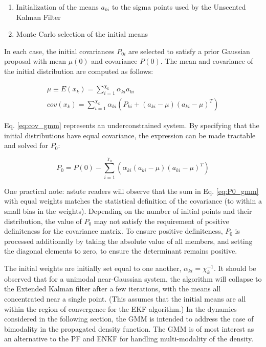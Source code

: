 \documentclass[]{article}
\begin{document}
\begin{enumerate}
	\item Initialization of the means $a_{ki}$ to the sigma points used by the Unscented Kalman Filter
	\item Monte Carlo selection of the initial means
\end{enumerate}

In each case, the initial covariances $P_{0i}$ are selected to satisfy a prior Gaussian proposal with mean $\mu(0)$ and covariance $P(0)$. The mean and covariance of the initial distribution are computed as follows:

\begin{align}
	\mu \equiv E(x_k) = \sum_{i=1}^{\chi_k} \alpha_{ki} a_{ki} \\
	cov(x_k) = \sum_{i=1}^{\chi_k} \alpha_{ki} (P_{ki} + (a_{ki}-\mu)(a_{ki}-\mu)^T) \label{eq:cov_gmm}
\end{align}

Eq. \ref{eq:cov_gmm} represents an underconstrained system. By specifying that the initial distributions have equal covariance, the expression can be made tractable and solved for $P_{0}$:

\begin{equation}
	P_{0} = P(0) - \sum_{i=1}^{\chi_k} (\alpha_{ki}(a_{ki}-\mu)(a_{ki}-\mu)^T)
	\label{eq:P0_gmm}
\end{equation}

One practical note: astute readers will observe that the sum in Eq. \ref{eq:P0_gmm} with equal weights matches the statistical definition of the covariance (to within a small bias in the weights). Depending on the number of initial points and their distribution, the value of $P_{0}$ may not satisfy the requirement of positive definiteness for the covariance matrix. To ensure positive definiteness, $P_{0}$ is processed additionally by taking the absolute value of all members, and setting the diagonal elements to zero, to ensure the determinant remains positive.

The initial weights are initially set equal to one another, $\alpha_{ki} = \chi_k^{-1}$. It should be observed that for a unimodal near-Gaussian system, the algorithm will collapse to the Extended Kalman filter after a few iterations, with the means all concentrated near a single point. (This assumes that the initial means are all within the region of convergence for the EKF algorithm.) In the dynamics considered in the following section, the GMM is intended to address the case of bimodality in the propagated density function. The GMM is of most interest as an alternative to the PF and ENKF for handling multi-modality of the density.
\end{document}
